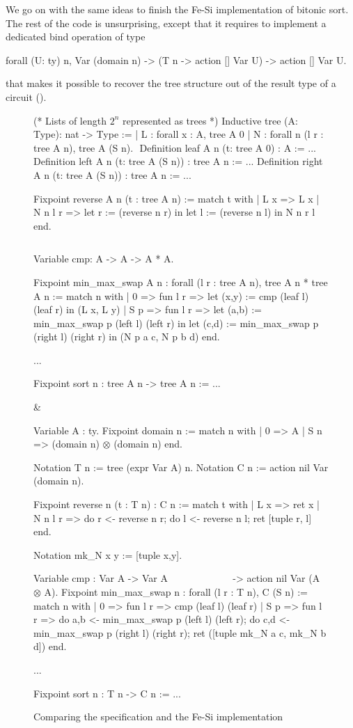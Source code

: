 \documentclass{llncs}
\begin{document}
We go on with the same ideas to finish the Fe-Si implementation of
bitonic sort. The rest of the code is unsurprising, except that it
requires to implement a dedicated bind operation of type
\begin{mcoq}
forall (U: ty) n,  Var (domain n) -> (T n -> action [] Var U) -> action [] Var U. 
\end{mcoq}
that makes it possible to recover the tree structure out of the
result type of a circuit ().

\begin{figure}[t]
  \centering
\begin{twolistings}
\begin{coq}
(* Lists of length $2^n$ represented as trees *)
Inductive tree (A: Type): nat -> Type :=
| L : forall x : A, tree A 0
| N : forall n (l r : tree A n), tree A (S n). 
$ $
Definition leaf  {A n} (t: tree A 0) : A := ...
Definition left  {A n} (t: tree A (S n)) : tree A n := ...
Definition right {A n} (t: tree A (S n)) : tree A n := ...

Fixpoint reverse {A} n (t : tree A n) :=
match t with 
| L x => L x
| N n l r => 
  let r := (reverse n r) in 
  let l := (reverse n l) in 
  N n r l
end.

$ $

Variable cmp: A -> A -> A * A.

Fixpoint min_max_swap {A} n : 
  forall (l r : tree A n), tree A n * tree A n :=
match n with 
| 0 => fun l r => 
  let (x,y) := cmp (leaf l) (leaf r) in (L x, L y)
| S p => fun l r => 
  let (a,b) := min_max_swap p (left l) (left r) in 
  let (c,d) := min_max_swap p (right l) (right r) in 
  (N p a c, N p b d)
end. 

...

Fixpoint sort n : tree A n -> tree A n := ...
\end{coq}
& $\quad$
\begin{coq}
Variable A : ty.        
Fixpoint domain n := match n with 
| 0 => A
| S n => (domain n) $\otimes$ (domain n)
end. 

Notation T n := tree (expr Var A) n. 
Notation C n := action nil Var (domain n). 

Fixpoint reverse n (t : T n) : C n  :=
match t with 
| L x => ret x
| N n l r => 
  do r <- reverse n r;
  do l <- reverse n l;
  ret [tuple r, l]
end.

Notation mk_N x y := [tuple x,y].

Variable cmp : Var A -> Var A 
$\qquad\qquad\qquad$ -> action nil Var (A $\otimes$ A).
Fixpoint min_max_swap n : 
  forall (l r : T n), C (S n) :=
match n  with 
| 0 => fun l r => 
  cmp (leaf l) (leaf r)
| S p => fun l r => 
  do a,b <- min_max_swap p (left l) (left r);
  do c,d <- min_max_swap p (right l) (right r); 
  ret ([tuple mk_N a c, mk_N b d])
end.

...

Fixpoint sort n : T n -> C n := ...
\end{coq}
\end{twolistings}
  
  \caption{Comparing the specification and the Fe-Si implementation}
  \label{fig:reverse}
\end{figure}
\end{document}
